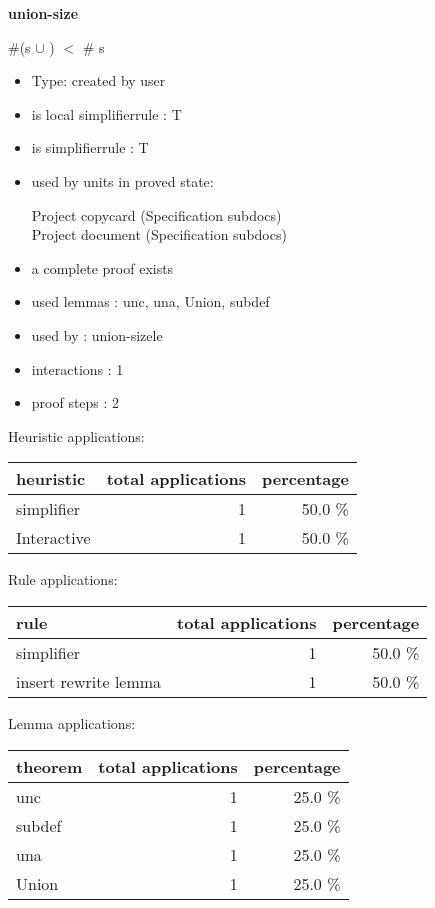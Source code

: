 \documentclass[a4paper]{article}
\begin{document}
{\LARGE\bf union-size}\label{lemma-union-size}

\medskip

 \Fol \Not \#(s $\cup$ ) $<$ \# s

\begin{itemize}

\item Type: created by user

\item is local simplifierrule : T
\item is simplifierrule : T
\item used by units in proved state:

Project copycard (Specification subdocs) \\
Project document (Specification subdocs)
\item       a complete proof exists
\item       used lemmas  : unc, una, Union, subdef
\item       used by      : union-sizele
\item       interactions : 1
\item       proof steps  : 2
\end{itemize}

\medskip


Heuristic applications:

\begin{supertabular}{l|r|r}
heuristic	& total applications & percentage \\ \hline
simplifier & 1 & 50.0 \% \\
Interactive & 1 & 50.0 \% \\

\end{supertabular}

Rule applications:

\begin{supertabular}{l|r|r}
rule	        & total applications & percentage \\ \hline
simplifier & 1 & 50.0 \% \\
insert rewrite lemma & 1 & 50.0 \% \\

\end{supertabular}

Lemma applications:

\begin{supertabular}{l|r|r}
theorem	        & total applications & percentage \\ \hline
unc & 1 & 25.0 \% \\
subdef & 1 & 25.0 \% \\
una & 1 & 25.0 \% \\
Union & 1 & 25.0 \% \\

\end{supertabular}
\pagebreak
\end{document}
